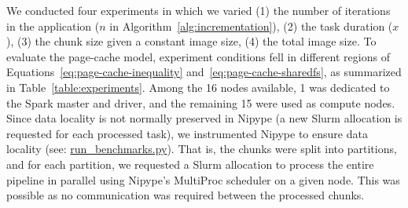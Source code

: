 \documentclass{IEEEtran}
\begin{document}
We conducted four experiments in which we varied (1) the number of 
iterations in the application ($n$ in 
Algorithm~\ref{alg:incrementation}), (2) the task duration ($x$), (3) 
the chunk size given a constant image size, (4) the total image size. To 
evaluate the page-cache model, experiment conditions fell in different 
regions of Equations~\ref{eq:page-cache-inequality} 
and~\ref{eq:page-cache-sharedfs}, as summarized in 
Table~\ref{table:experiments}. Among the 16 nodes available, 1 was 
dedicated to the Spark master and driver, and the remaining 15 were 
used as compute nodes. Since data locality is not normally preserved in 
Nipype (a new Slurm allocation is requested for each processed task), 
we instrumented Nipype to ensure data locality (see: \href{https://github.com/big-data-lab-team/paper-in-mem-locality/blob/master/benchmark\_scripts/run\_benchmarks.py}{run\_benchmarks.py}).
That is, the chunks were split into partitions, and for each partition,
we requested a Slurm allocation to process the entire 
pipeline in parallel using Nipype's MultiProc scheduler on a given 
node. This was possible as no communication was required between the 
processed chunks.
\end{document}
